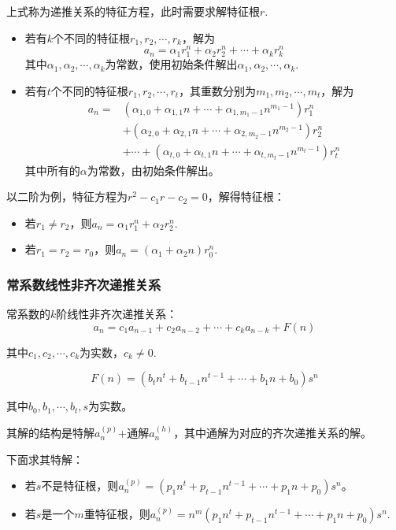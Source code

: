 上式称为递推关系的特征方程，此时需要求解特征根$r$.
\begin{itemize}
    \item 若有$k$个不同的特征根$r_1, r_2, \cdots, r_k$，解为
    \[a_n = \alpha_1 r_1^n + \alpha_2 r_2^n + \cdots + \alpha_k r_k^n\]
    其中$\alpha_1, \alpha_2, \cdots, \alpha_k$为常数，使用初始条件解出$\alpha_1, \alpha_2, \cdots, \alpha_k$.
    \item 若有$t$个不同的特征根$r_1, r_2, \cdots, r_t$，其重数分别为$m_1, m_2, \cdots, m_t$，解为
    \begin{align*}
    a_n =
    & (\alpha_{1,0} + \alpha_{1,1} n + \cdots + \alpha_{1,m_1 -1} n ^{m_1-1}) r_1^n \\
    &+ (\alpha_{2,0} + \alpha_{2,1} n + \cdots + \alpha_{2,m_2 -1} n ^{m_2-1}) r_2^n \\
    &+ \cdots + (\alpha_{t,0} + \alpha_{t,1} n + \cdots + \alpha_{t,m_t -1} n ^{m_t-1}) r_t^n
    \end{align*}
    其中所有的$\alpha$为常数，由初始条件解出。
\end{itemize}

以二阶为例，特征方程为$r^2 - c_1 r - c_2 = 0$，解得特征根：
\begin{itemize}
    \item 若$r_1 \neq r_2$，则$a_n = \alpha_1 r_1^n + \alpha_2 r_2^n$.
    \item 若$r_1 = r_2 = r_0$，则$a_n = (\alpha_1 + \alpha_2 n) r_0^n$.
\end{itemize}

\subsubsection*{常系数线性非齐次递推关系}
常系数的$k$阶线性非齐次递推关系：
\[a_n = c_1 a_{n-1} + c_2 a_{n-2} + \cdots + c_k a_{n-k} + F(n)\]

其中$c_1,c_2,\cdots,c_k$为实数，$c_k \neq 0$.

\[F(n) = (b_t n^t + b_{t-1} n^{t-1} + \cdots + b_1 n + b_0)s^n\]

其中$b_0, b_1, \cdots, b_t,s$为实数。

其解的结构是特解$a_n^{(p)}$+通解$a_n^{(h)}$，其中通解为对应的齐次递推关系的解。

下面求其特解：
\begin{itemize}
    \item 若$s$不是特征根，则$a_n^{(p)} = (p_1 n^t + p_{t-1} n^{t-1} + \cdots + p_1 n + p_0) s^n$。
    \item 若$s$是一个$m$重特征根，则$a_n^{(p)} = n^m (p_1 n^t + p_{t-1} n^{t-1} + \cdots + p_1 n + p_0) s^n$.
\end{itemize}

